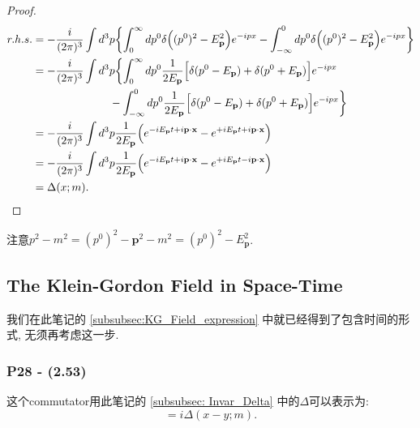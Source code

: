 \documentclass[cn,hazy,blue,11pt,device=normal,chinesefont=founder]{elegantnote}
\begin{document}
\begin{proof}
  \begin{equation}
    \begin{aligned}
      r. h. s. &= -\frac{i}{(2\pi)^3}\int d^3 p \biggl\{ \int_{0}^{\infty}dp^0\delta\Bigl((p^0)^2 - E_\mathbf{p}^2\Bigr)e^{-ipx} - \int_{-\infty}^{0}dp^0\delta\Bigl((p^0)^2 - E_\mathbf{p}^2\Bigr)e^{-ipx} \biggr\} \\
               &= -\frac{i}{(2\pi)^3}\int d^3 p \biggl\{ \int_{0}^{\infty}dp^0\frac{1}{2E_\mathbf{p}}\Bigl[\delta(p^0 - E_\mathbf{p}) + \delta(p^0 + E_\mathbf{p}) \Bigr]e^{-ipx} \\
               &\qquad \qquad \qquad \quad - 
               \int_{-\infty}^{0}dp^0\frac{1}{2E_\mathbf{p}}\Bigl[\delta(p^0 - E_\mathbf{p}) + \delta(p^0 + E_\mathbf{p}) \Bigr]e^{-ipx}\biggr\} \\
               &= -\frac{i}{(2\pi)^3} \int d^3 p \frac{1}{2E_\mathbf{p}} \Bigl(e^{-iE_\mathbf{p} t + i \mathbf{p} \cdot \mathbf{x}} - e^{+iE_\mathbf{p} t + i \mathbf{p} \cdot \mathbf{x}}\Bigr) \\ 
               &= -\frac{i}{(2\pi)^3} \int d^3 p \frac{1}{2E_\mathbf{p}} \Bigl(e^{-iE_\mathbf{p} t + i \mathbf{p} \cdot \mathbf{x}} - e^{+iE_\mathbf{p} t - i \mathbf{p} \cdot \mathbf{x}}\Bigr) \\
               &= \Delta(x; m). 
    \end{aligned}
  \end{equation}
\end{proof}

\begin{remark}
  注意$p^2 - m^2 = (p^0)^2 - \mathbf{p}^2 - m^2 = (p^0)^2 - E_\mathbf{p}^2$. 
\end{remark}

\subsection{The Klein-Gordon Field in Space-Time}

我们在此笔记的 \ref{subsubsec:KG_Field_expression} 中就已经得到了包含时间的形式, 无须再考虑这一步. 

\subsubsection{P28 - (2.53)}

这个commutator用此笔记的 \ref{subsubsec: Invar_Delta} 中的$\Delta$可以表示为: 
\begin{equation}
  [\phi(x), \phi(y)] = i\Delta(x-y; m). 
\end{equation}
\end{document}
